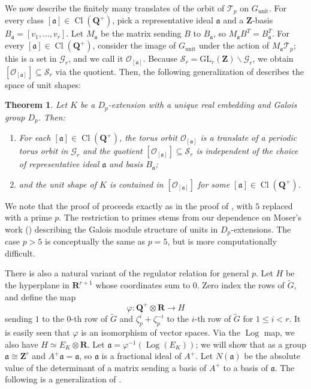 \documentclass{amsart}
\newcommand{\QQ}{\mathbf{Q}}
\newcommand{\ZZ}{\mathbf{Z}}
\newcommand{\RR}{\mathbf{R}}
\newcommand{\gl}{\mathrm{GL}}
\DeclareMathOperator{\unit}{unit}
\DeclareMathOperator{\Cl}{Cl}
\DeclareMathOperator{\Log}{Log}
\newtheorem{theorem}{Theorem}[section]
\numberwithin{equation}{section}
\begin{document}
We now describe the finitely many translates of the orbit of $\mathcal{T}_p$ on $G_{\unit}$. For every class $[\mathfrak{a}] \in \Cl(\QQ^+)$, pick a representative ideal $\mathfrak{a}$ and a $\ZZ$-basis $B_{\mathfrak{a}} = [v_1,\dots,v_{r}]$.  Let $M_{\mathfrak{a}}$ be the matrix sending $B$ to $B_{\mathfrak{a}}$, so $M_{\mathfrak{a}}B^T = B_{\mathfrak{a}}^T$. For every $[\mathfrak{a}] \in \Cl(\QQ^+)$, consider the image of $G_{\unit}$ under the action of $M_{\mathfrak{a}}\mathcal{T}_p$; this is a set in $\mathcal{G}_r$, and we call it $\mathcal{O}_{[\mathfrak{a}]}$. Because $\mathcal{S}_r = \gl_r(\ZZ) \backslash \mathcal{G}_r$, we obtain $[\mathcal{O}_{[\mathfrak{a}]}] \subseteq \mathcal{S}_r$ via the quotient. Then, the following generalization of  describes the space of unit shapes:

\begin{theorem}\label{maintheorem}
    Let $K$ be a $D_p$-extension with a unique real embedding and Galois group $D_p$. Then:
    \begin{enumerate}
        \item For each $[\mathfrak{a}] \in \Cl(\QQ^+)$, the torus orbit $\mathcal{O}_{[\mathfrak{a}]}$ is a translate of a periodic torus orbit in $\mathcal{G}_r$ and the quotient $[\mathcal{O}_{[\mathfrak{a}]}] \subseteq \mathcal{S}_r$ is independent of the choice of representative ideal $\mathfrak{a}$ and basis $B_{\mathfrak{a}}$;
        \item and the unit shape of $K$ is contained in $[\mathcal{O}_{[\mathfrak{a}]}]$ for some $[\mathfrak{a}] \in \Cl(\QQ^+)$.
    \end{enumerate} 
\end{theorem}

We note that the proof of  proceeds exactly as in the proof of , with $5$ replaced with a prime $p$. The restriction to primes stems from our dependence on Moser's work (\cite{Moser1979}) describing the Galois module structure of units in $D_p$-extensions. The case $p > 5$ is conceptually the same as $p = 5$, but is more computationally difficult.

There is also a natural variant of the regulator relation for general $p$. Let $H$ be the hyperplane in $\RR^{r+1}$ whose coordinates sum to $0$. Zero index the rows of $\widetilde{G}$, and define the map
\[
    \varphi \colon \QQ^+ \otimes \RR \rightarrow H
\]
sending $1$ to the $0$-th row of $\widetilde{G}$ and $\zeta_p^i + \zeta_p^{-i}$ to the $i$-th row of $\widetilde{G}$ for $1 \leq i < r$. It is easily seen that $\varphi$ is an isomorphism of vector spaces. Via the $\Log$ map, we also have $H \simeq E_K \otimes \RR$.  Let $\mathfrak{a} = \varphi^{-1}(\Log(E_K))$; we will show that as a group $\mathfrak{a} \cong \ZZ^r$ and $A^+ \mathfrak{a} = \mathfrak{a}$, so $\mathfrak{a}$ is a fractional ideal of $A^+$. Let $N(\mathfrak{a})$ be the absolute value of the determinant of a matrix sending a basis of $A^+$ to a basis of $\mathfrak{a}$. The following is a generalization of .
\end{document}
